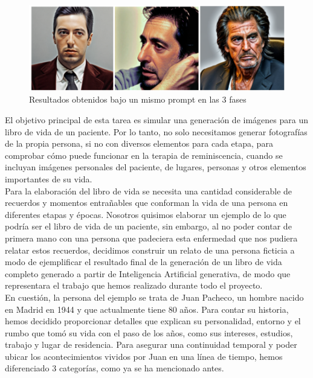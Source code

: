 \begin{figure}[!htb]
	\centering
	\includegraphics[width = 1
	\textwidth]{Imagenes/Vectorial/3fasesvidaalp.png}
	\caption{Resultados obtenidos bajo un mismo prompt en las 3 fases}
	\label{fig:3fasesvidaalp}
\end{figure}


El objetivo principal de esta tarea es simular una generación de imágenes para un libro de vida de un paciente. Por lo tanto, no solo necesitamos generar fotografías de la propia persona, si no con diversos elementos para cada etapa, para comprobar cómo puede funcionar en la terapia de reminiscencia, cuando se incluyan imágenes personales del paciente, de lugares, personas y otros elementos importantes de su vida.\\

Para la elaboración del libro de vida se necesita una cantidad considerable de recuerdos y momentos entrañables que conforman la vida de una persona en diferentes etapas y épocas. Nosotros quisimos elaborar un ejemplo de lo que podría ser el libro de vida de un paciente, sin embargo, al no poder contar de primera mano con una persona que padeciera esta enfermedad que nos pudiera relatar estos recuerdos, decidimos construir un relato de una persona ficticia a modo de ejemplificar el resultado final de la generación de un libro de vida completo generado a partir de Inteligencia Artificial generativa, de modo que representara el trabajo que hemos realizado durante todo el proyecto. \\

En cuestión, la persona del ejemplo se trata de Juan Pacheco, un hombre nacido en Madrid en 1944 y que actualmente tiene 80 años. Para contar su historia, hemos decidido proporcionar detalles que explican su personalidad, entorno y el rumbo que tomó su vida con el paso de los años, como sus intereses, estudios, trabajo y lugar de residencia. Para asegurar una continuidad temporal y poder ubicar los acontecimientos vividos por Juan en una línea de tiempo, hemos diferenciado 3 categorías, como ya se ha mencionado antes. \\

